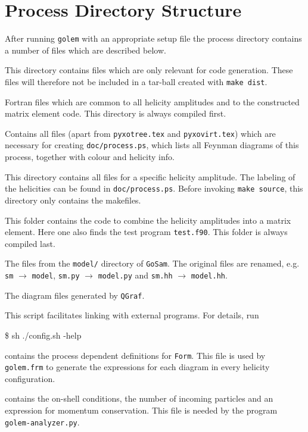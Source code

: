 \documentclass[11pt,a4paper]{refrep}
\newcommand{\golemversion}{{1{.}0}}
\newcommand{\golemv}[1][\golemversion]{{\tt GoSam}\xspace}
\newcommand{\qgraf}{{\tt QGraf}\xspace}
\newcommand{\form}{{\tt Form}\xspace}
\begin{document}
\section{Process Directory Structure}
After running \texttt{golem} with an appropriate setup file the
process directory contains a number of files which are described below.

 This directory contains files which are only
relevant for code generation. These files will therefore not be included
in a tar-ball created with \texttt{make dist}.

 Fortran files which are common to all helicity
amplitudes and to the constructed matrix element code. This directory
is always compiled first.

 Contains all files (apart from
\texttt{pyxotree.tex} and \texttt{pyxovirt.tex}) which are
necessary for creating
\texttt{doc/process.ps}, which lists all Feynman diagrams of this process, 
together with colour and helicity info.

 This directory contains all files for a specific
helicity amplitude. The labeling of the helicities can be found in
\texttt{doc/process.ps}. Before invoking \texttt{make source}, 
this directory only contains the makefiles.

 This folder contains the code to combine
the helicity amplitudes into a matrix element. Here one also finds
the test program \texttt{test.f90}. This folder is always compiled last.

 The files from the \texttt{model/}
directory of \golemv. The original files are renamed, e.g.
\texttt{sm} $\to$ \texttt{model}, \texttt{sm.py} $\to$ \texttt{model.py}
and \texttt{sm.hh} $\to$ \texttt{model.hh}.

 The diagram files generated
by \qgraf.

 This script facilitates linking with external
programs. For details, run
\begin{example}
\$ sh ./config.sh -help
\end{example}

 contains the process dependent definitions
for \form. This file is used by \texttt{golem.frm} to generate the expressions
for each diagram in every helicity configuration.

 contains the on-shell conditions, the number of
incoming particles and an expression for momentum conservation. This
file is needed by the program \texttt{golem-analyzer.py}.
\end{document}
